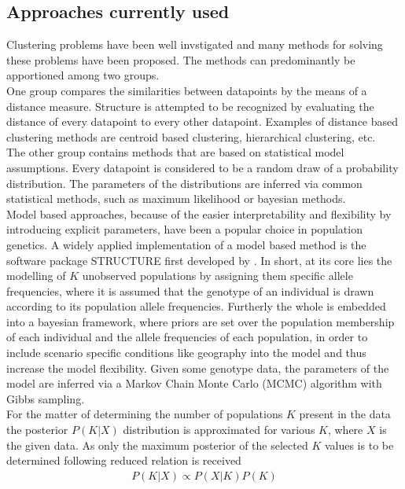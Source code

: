 \documentclass[a4paper, 11pt]{article}
\begin{document}
\subsection{Approaches currently used}
Clustering problems have been well invstigated and many methods for solving these problems have been proposed. The methods can predominantly be apportioned among two groups.\\
One group compares the similarities between datapoints by the means of a distance measure. Structure is attempted to be recognized by evaluating the distance of every datapoint to every other datapoint. Examples of distance based clustering methods are centroid based clustering, hierarchical clustering, etc.\\
The other group contains methods that are based on statistical model assumptions. Every datapoint is considered to be a random draw of a probability distribution. The parameters of the distributions are inferred via common statistical methods, such as maximum likelihood or bayesian methods. \\
Model based approaches, because of the easier interpretability and flexibility by introducing explicit parameters, have been a popular choice in population genetics. A widely applied \parencite{rosenberg2002genetic, harter2004origin, rosenberg2001empirical} implementation of a model based method is the software package STRUCTURE first developed by \parencite{pritchard2000inference, falush2003inference}. In short, at its core lies the modelling of $K$ unobserved populations by assigning them specific allele frequencies, where it is assumed that the genotype of an individual is drawn according to its population allele frequencies. Furtherly the whole is embedded into a bayesian framework, where priors are set over the population membership of each individual and the allele frequencies of each population, in order to include scenario specific conditions like geography into the model and thus increase the model flexibility. Given some genotype data, the parameters of the model are inferred via a Markov Chain Monte Carlo (MCMC) algorithm with Gibbs sampling.\\
For the matter of determining the number of populations $K$ present in the data the posterior $P(K|X)$ distribution is approximated for various $K$, where $X$ is the given data. As only the maximum posterior of the selected $K$ values is to be determined following reduced relation is received
\begin{align*}
P(K|X) \propto P(X|K)P(K) 
\end{align*}
\end{document}
